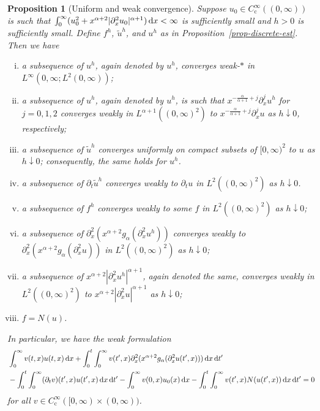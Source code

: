 \documentclass[reqno,12pt]{amsart}
\renewcommand{\d}{\ensuremath{\mathrm{d}}}
\renewcommand{\d}{\ensuremath{{\rm d}}}
\newtheorem{proposition}[theorem]{Proposition}
\numberwithin{equation}{section}
\begin{document}
\begin{proposition}[Uniform and weak convergence]\label{lem-uniform}
Suppose $u_0 \in C^\infty_\mathrm{c}((0,\infty))$ is such that $\int_0^\infty (u_0^2 + x^{\alpha+2} |\partial_x^2 u_0|^{\alpha+1}) \, \d x < \infty$ is sufficiently small and $h > 0$ is sufficiently small. Define $f^h$, $\tilde u^h$, and $u^h$ as in Proposition~\ref{prop-discrete-est}. Then we have
%
\begin{enumerate}[(i)]
\item\label{it:weak*} a subsequence of $u^h$, again denoted by $u^h$, converges weak-$*$ in $L^\infty(0,\infty;L^2(0,\infty))$;
\item\label{it:weak}
a subsequence of $u^h$, again denoted by $u^h$, is such that $x^{-\frac{\alpha}{\alpha+1}+j} \partial_x^j u^h$ for $j = 0,1,2$ converges weakly in $L^{\alpha+1}((0,\infty)^2)$ to $x^{-\frac{\alpha}{\alpha+1}+j} \partial_x^j u$ as $h \downarrow 0$, respectively;
\item\label{it:uniform} a subsequence of $\tilde u^h$ converges uniformly on compact subsets of $[0,\infty)^2$ to $u$ as $h \downarrow 0$; consequently, the same holds for $u^h$.
\item\label{it:time} a subsequence of $\partial_t \tilde u^h$ converges weakly to $\partial_t u$ in $L^2((0,\infty)^2)$ as $h \downarrow 0$.
\item\label{it:rhs} a subsequence of $f^h$ converges weakly to some $f$ in $L^2((0,\infty)^2)$ as $h \downarrow 0$;
\item\label{it:minty} a subsequence of $\partial_x^2(x^{\alpha+2} g_\alpha(\partial_x^2 u^h))$ converges weakly to $\partial_x^2 (x^{\alpha+2} g_\alpha(\partial_x^2 u))$ in $L^2((0,\infty)^2)$ as $h \downarrow 0$;
\item\label{it:weak2} 
a subsequence of $x^{\alpha+2} |\partial_x^2 u^h|^{\alpha+1}$, again 
denoted the same, converges weakly in 
$L^{2}((0,\infty)^2)$ to $x^{\alpha+2} |\partial_x^2 u|^{\alpha+1}$ 
as $h \downarrow 0$;
\item\label{it:rhs2} $f = N(u)$.
\end{enumerate}
%
In particular, we have the weak formulation
%
\begin{align}\nonumber
& \int_0^\infty v(t,x) u(t,x) \, \d x + \int_0^t \int_0^\infty v(t',x) \partial_x^2 (x^{\alpha+2} g_\alpha(\partial_x^2 u(t',x))) \, \d x \, \d t' \\
& - \int_0^t \int_0^\infty (\partial_t v)(t',x) u(t',x) \, \d x \, \d t' - \int_0^\infty v(0,x) u_0(x) \, \d x - \int_0^t \int_0^\infty v(t',x) N(u(t',x)) \, \d x \, \d t' = 0  \label{eq-u-tested}
\end{align}
%
for all $v \in C^\infty_\mathrm{c}([0,\infty) \times (0,\infty))$.
\end{proposition}
%
\end{document}

